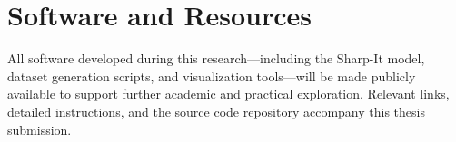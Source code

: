 
\section{Software and Resources}

All software developed during this research—including the Sharp-It model, dataset generation scripts, and visualization tools—will be made publicly available to support further academic and practical exploration. Relevant links, detailed instructions, and the source code repository accompany this thesis submission.